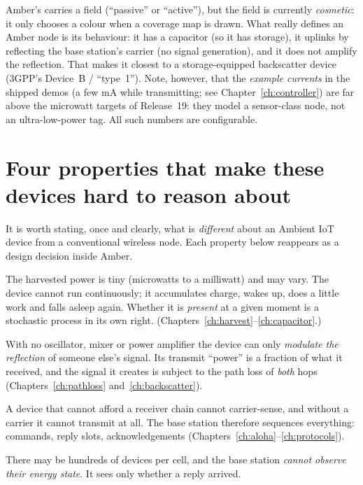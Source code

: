 \begin{reality}
Amber's  carries a  field (``passive'' or
``active''), but the field is currently \emph{cosmetic}: it only chooses a
colour when a coverage map is drawn. What really defines an Amber node is its
behaviour: it has a capacitor (so it has storage), it uplinks by
reflecting the base station's carrier (no signal generation), and it does not
amplify the reflection. That makes it closest to a storage-equipped
backscatter device (3GPP's Device~B / ``type~1''). Note, however, that the
\emph{example currents} in the shipped demos (a few mA while transmitting;
see Chapter~\ref{ch:controller}) are far above the microwatt targets of
Release~19: they model a sensor-class node, not an ultra-low-power tag. All
such numbers are configurable.
\end{reality}

\section{Four properties that make these devices hard to reason about}
\label{sec:fourprops}

It is worth stating, once and clearly, what is \emph{different} about an
Ambient IoT device from a conventional wireless node. Each property below
reappears as a design decision inside Amber.

\begin{description}[leftmargin=0.6cm,font=\sffamily\bfseries\color{ablue}]
 \item[P1 --- Energy intermittency.] The harvested power is tiny (microwatts to
   a milliwatt) and may vary. The device cannot run continuously; it
   accumulates charge, wakes up, does a little work and falls asleep again.
   Whether it is \emph{present} at a given moment is a stochastic process in
   its own right. (Chapters~\ref{ch:harvest}--\ref{ch:capacitor}.)
 \item[P2 --- Reflective uplink.] With no oscillator, mixer or power amplifier
   the device can only \emph{modulate the reflection} of someone else's signal.
   Its transmit ``power'' is a fraction of what it received, and the signal
   it creates is subject to the path loss of \emph{both} hops
   (Chapters~\ref{ch:pathloss} and~\ref{ch:backscatter}).
 \item[P3 --- Reader-driven medium access.] A device that cannot afford a
   receiver chain cannot carrier-sense, and without a carrier it cannot
   transmit at all. The base station therefore sequences everything:
   commands, reply slots, acknowledgements
   (Chapters~\ref{ch:aloha}--\ref{ch:protocols}).
 \item[P4 --- Massive scale and limited visibility.] There may be hundreds of
   devices per cell, and the base station \emph{cannot observe their energy
   state}. It sees only whether a reply arrived.
\end{description}


